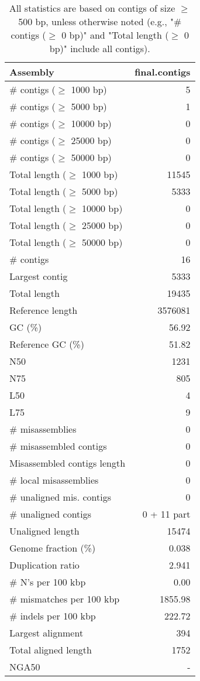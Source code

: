 \documentclass[12pt,a4paper]{article}
\begin{document}
\begin{table}[ht]
\begin{center}
\caption{All statistics are based on contigs of size $\geq$ 500 bp, unless otherwise noted (e.g., "\# contigs ($\geq$ 0 bp)" and "Total length ($\geq$ 0 bp)" include all contigs).}
\begin{tabular}{|l*{1}{|r}|}
\hline
Assembly & final.contigs \\ \hline
\# contigs ($\geq$ 1000 bp) & 5 \\ \hline
\# contigs ($\geq$ 5000 bp) & 1 \\ \hline
\# contigs ($\geq$ 10000 bp) & 0 \\ \hline
\# contigs ($\geq$ 25000 bp) & 0 \\ \hline
\# contigs ($\geq$ 50000 bp) & 0 \\ \hline
Total length ($\geq$ 1000 bp) & 11545 \\ \hline
Total length ($\geq$ 5000 bp) & 5333 \\ \hline
Total length ($\geq$ 10000 bp) & 0 \\ \hline
Total length ($\geq$ 25000 bp) & 0 \\ \hline
Total length ($\geq$ 50000 bp) & 0 \\ \hline
\# contigs & 16 \\ \hline
Largest contig & 5333 \\ \hline
Total length & 19435 \\ \hline
Reference length & 3576081 \\ \hline
GC (\%) & 56.92 \\ \hline
Reference GC (\%) & 51.82 \\ \hline
N50 & 1231 \\ \hline
N75 & 805 \\ \hline
L50 & 4 \\ \hline
L75 & 9 \\ \hline
\# misassemblies & 0 \\ \hline
\# misassembled contigs & 0 \\ \hline
Misassembled contigs length & 0 \\ \hline
\# local misassemblies & 0 \\ \hline
\# unaligned mis. contigs & 0 \\ \hline
\# unaligned contigs & 0 + 11 part \\ \hline
Unaligned length & 15474 \\ \hline
Genome fraction (\%) & 0.038 \\ \hline
Duplication ratio & 2.941 \\ \hline
\# N's per 100 kbp & 0.00 \\ \hline
\# mismatches per 100 kbp & 1855.98 \\ \hline
\# indels per 100 kbp & 222.72 \\ \hline
Largest alignment & 394 \\ \hline
Total aligned length & 1752 \\ \hline
NGA50 & - \\ \hline
\end{tabular}
\end{center}
\end{table}
\end{document}
